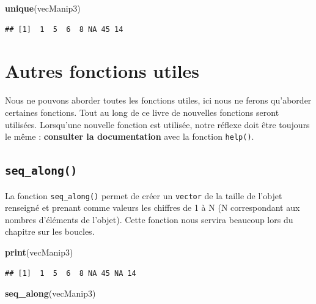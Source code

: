 \documentclass[twoside,symmetric]{book}
\newenvironment{Shaded}{}{}
\newcommand{\KeywordTok}[1]{\textbf{#1}}
\newcommand{\NormalTok}[1]{#1}
\begin{document}
\begin{Shaded}
\begin{Highlighting}[]
\KeywordTok{unique}\NormalTok{(vecManip3)}
\end{Highlighting}
\end{Shaded}

\begin{verbatim}
## [1]  1  5  6  8 NA 45 14
\end{verbatim}

\hypertarget{autres-fonctions-utiles}{%
\section{Autres fonctions utiles}\label{autres-fonctions-utiles}}

Nous ne pouvons aborder toutes les fonctions utiles, ici nous ne ferons qu'aborder certaines fonctions. Tout au long de ce livre de nouvelles fonctions seront utilisées. Lorsqu'une nouvelle fonction est utilisée, notre réflexe doit être toujours le même : \textbf{consulter la documentation} avec la fonction \texttt{help()}.

\hypertarget{l015seqalong}{%
\subsection{\texorpdfstring{\texttt{seq\_along()}}{seq\_along()}}\label{l015seqalong}}

La fonction \texttt{seq\_along()} permet de créer un \texttt{vector} de la taille de l'objet renseigné et prenant comme valeurs les chiffres de 1 à N (N correspondant aux nombres d'éléments de l'objet). Cette fonction nous servira beaucoup lors du chapitre sur les boucles.

\begin{Shaded}
\begin{Highlighting}[]
\KeywordTok{print}\NormalTok{(vecManip3)}
\end{Highlighting}
\end{Shaded}

\begin{verbatim}
## [1]  1  5  6  8 NA 45 NA 14
\end{verbatim}

\begin{Shaded}
\begin{Highlighting}[]
\KeywordTok{seq_along}\NormalTok{(vecManip3)}
\end{Highlighting}
\end{Shaded}
\end{document}
